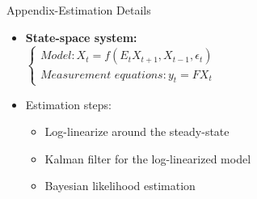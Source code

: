 \documentclass[8pt,aspectratio=169]{beamer}
\numberwithin{equation}{section}
\begin{document}
\begin{frame}{Appendix-Estimation Details}

\begin{itemize}
\item \textbf{State-space system:} \\
\vspace{5 mm}
$
\begin{cases}
 \textit{Model}: X_t = f(E_tX_{t+1},X_{t-1},\epsilon_t)   \\
 \textit{Measurement equations}: y_t = F X_t
\end{cases}
$
\vspace{5 mm}
\item Estimation steps: 


\begin{itemize}
\item Log-linearize around the steady-state 
\vspace{5 mm}
\item Kalman filter for the log-linearized model
\vspace{5 mm}
\item Bayesian likelihood estimation

\end{itemize}

\end{itemize}

\end{frame}
\end{document}
